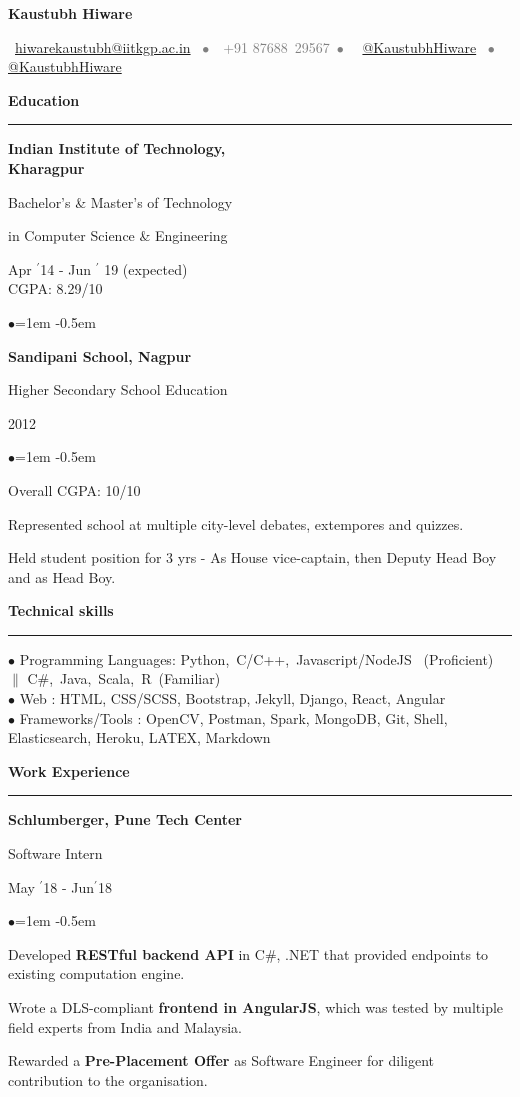 \documentclass[11pt, a4paper]{resume}
\newcommand{\important}[1]{
	\textcolor{mypurple}{#1}
}
\newcommand{\greyed}[1]{
	\textcolor{gray}{#1}
}
\newcommand{\titleX}[1]{
	\begin{LARGE}
    	\important{\centerline{\textbf{#1}}}
    \end{LARGE}
}
\newcommand{\sectionTitle}[1]{
	\begin{Large}
    	\important{\textbf{#1}}\newline
    \end{Large}
    \important{\noindent\rule{19cm}{0.4pt}} \newline
}
\newcommand\textbox[1]{
  \parbox{.333\textwidth}{#1}
}
\newenvironment{Jobsection}[3]{ %
\noindent\textbox{\bf #1\hfill}\textbox{\hfil #2\hfil}\textbox{\hfill #3}
  \begin{list}{$\bullet$}{\leftmargin=1em} %
   \itemsep -0.5em \vspace{-0.5em} %
  }{
  \end{list}
  \vspace{0.5em} %
}
\begin{document}
\titleX{Kaustubh Hiware}
\normalsize
\vspace{6pt}
\greyed{\centerline{\faEnvelopeO \, \href{mailto:hiwarekaustubh@iitkgp.ac.in}{ 
hiwarekaustubh@iitkgp.ac.in} \, $\bullet$ \,\faMobile\, +91 87688\, 29567\, $\bullet$ \, 
\faTwitter \, \href{https://twitter.com/kaustubhhiware}{@KaustubhHiware} \, $\bullet$ \, 
\faGithub \, \href{https://github.com/kaustubhhiware}{@KaustubhHiware}
}}

\vspace{2pt}
\sectionTitle{Education}
\begin{Jobsection}{Indian Institute of Technology,\\ Kharagpur}{Bachelor's \& Master's of 
Technology \centerline{in Computer Science \& Engineering}}{Apr $^{\prime}$14 - Jun 
$^{\prime}$ 19 (expected) \\\hspace*{\fill} CGPA: 8.29/10}
\item
\end{Jobsection}

\begin{Jobsection}{Sandipani School, Nagpur}{Higher Secondary School Education}{2012}
\item Overall CGPA: 10/10
\item Represented school at multiple city-level debates, extempores and quizzes.
\item Held student position for 3 yrs - As House vice-captain, then Deputy Head Boy and as 
Head Boy.
\end{Jobsection}


\sectionTitle{Technical skills}
$\bullet$ Programming Languages: Python,\, C/C++,\, Javascript/NodeJS \, (Proficient)\, $\|$ 
C\#,\, Java,\, Scala,\, R\, (Familiar) \\
$\bullet$ Web : HTML, CSS/SCSS, Bootstrap, Jekyll, Django, React, Angular \\
$\bullet$  Frameworks/Tools
: OpenCV, Postman, Spark, MongoDB, Git, Shell, Elasticsearch, Heroku, LATEX, Markdown

\sectionTitle{Work Experience}
\begin{Jobsection}{Schlumberger, Pune Tech Center}{Software Intern}{ May $^{\prime}$18 - 
Jun$^{\prime}$18}
\item Developed {\bf RESTful backend API} in C\#, .NET that provided endpoints to existing 
computation engine.
\item Wrote a DLS-compliant {\bf frontend in AngularJS}, which was tested  by multiple field 
experts from India and Malaysia.
\item Rewarded a {\bf Pre-Placement Offer} as Software Engineer for diligent contribution to 
the organisation.
\end{Jobsection}
\end{document}
